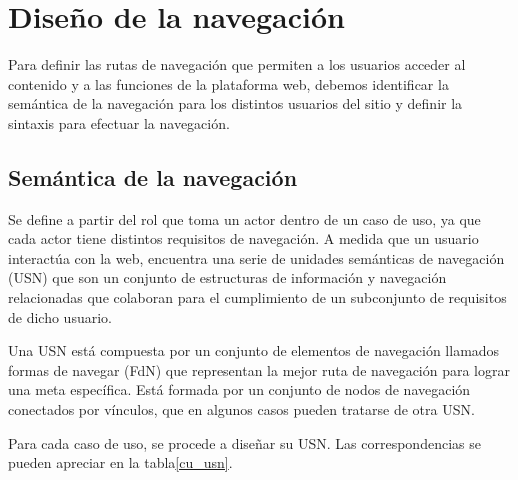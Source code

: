 \section{Diseño de la navegación}
Para definir las rutas de navegación que permiten a los usuarios acceder al contenido y a las funciones de la plataforma web, debemos identificar la semántica de la navegación para los distintos usuarios del sitio y definir la sintaxis para efectuar la navegación.


\subsection{Semántica de la navegación}
Se define a partir del rol que toma un actor dentro de un caso de uso, ya que cada actor tiene distintos requisitos de navegación. A medida que un usuario interactúa con la web, encuentra una serie de unidades semánticas de navegación (USN) que son un conjunto de estructuras de información y navegación relacionadas que colaboran para el cumplimiento de un subconjunto de requisitos de dicho usuario.


Una USN está compuesta por un conjunto de elementos de navegación llamados formas de navegar (FdN) que representan la mejor ruta de navegación para lograr una meta específica. Está formada por un conjunto de nodos de navegación conectados por vínculos, que en algunos casos pueden tratarse de otra USN.


Para cada caso de uso, se procede a diseñar su USN. Las correspondencias se pueden apreciar en la tabla\ref{cu_usn}.


